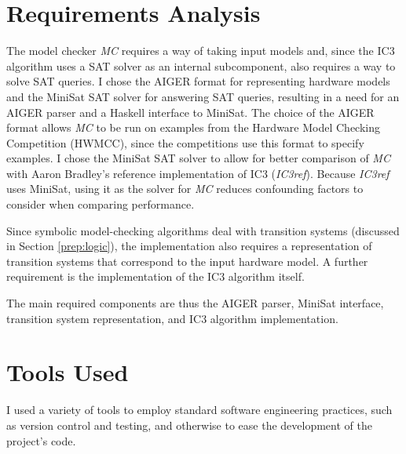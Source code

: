 \documentclass[12pt,a4paper,twoside,openright]{report}
\begin{document}
\section{Requirements Analysis}
\label{prep:requirements}


The model checker \emph{MC} requires a way of taking input models and, since
the IC3 algorithm uses a SAT solver as an internal subcomponent, also
requires a way to solve SAT queries.
I chose the AIGER format for representing hardware models and the
MiniSat SAT solver for answering SAT queries, resulting in a need for an
AIGER parser and a Haskell interface to MiniSat. The choice of
the AIGER format allows \emph{MC} to be run on examples from
the Hardware Model Checking Competition (HWMCC), since the competitions
use this format to specify examples. I chose the MiniSat SAT
solver to allow for better comparison of \emph{MC}
with Aaron Bradley's reference implementation of IC3 (\emph{IC3ref})\cite{refic3}.
Because \emph{IC3ref} uses MiniSat, using it as the solver
for \emph{MC} reduces confounding factors to consider when comparing performance.

Since symbolic model-checking algorithms deal with transition systems
(discussed in Section \ref{prep:logic}), the implementation also requires a representation of
transition systems that correspond to the input hardware model.
A further requirement is the implementation of the
IC3 algorithm itself.

The main required components are thus the AIGER parser, MiniSat interface,
transition system representation, and IC3 algorithm implementation.

\section{Tools Used}
\label{prep:tools}

I used a variety of tools to employ standard software engineering practices, such
as version control and testing, and otherwise to ease the development of
the project's code.
\end{document}
